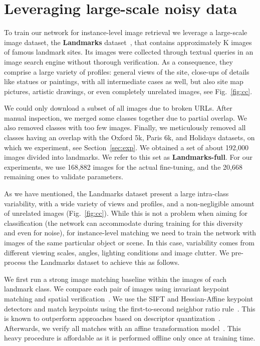 \documentclass[runningheads]{llncs}
\newcommand{\myparagraph}[1]{\noindent {\bf #1.}}
\begin{document}
\section{Leveraging large-scale noisy data}
\label{sec:cleaning}
To train our network for instance-level image retrieval we leverage a large-scale image dataset, the
\textbf{Landmarks} dataset~\cite{Babenko2014}, that contains approximately K images 
of  famous landmark sites. 
Its images were collected through textual queries in an image search engine without thorough verification.
As a consequence, they comprise a large variety of profiles:
general views of the site, close-ups of details like statues or paintings, 
with all intermediate cases as well, but also site map pictures, artistic drawings, or even completely unrelated images, see Fig.~\ref{fig:cc}.

We could only download a subset of all images due to broken URLs. After manual inspection, we merged some classes
together due to partial overlap.  We also removed classes with too few images. Finally, we meticulously removed all
classes having an overlap with the Oxford 5k, Paris 6k, and Holidays datasets, on which we experiment, see
Section~\ref{sec:exp}.
We obtained a set of about 192,000 images divided into  landmarks.
We refer to this set as \textbf{Landmarks-full}.
For our experiments, we use 168,882 images for the actual fine-tuning, and the 20,668 remaining ones to validate parameters.

\myparagraph{Cleaning the Landmarks dataset} 
As we have mentioned, the Landmarks dataset present a large intra-class variability, with a wide variety of views and profiles, and
a non-negligible amount of unrelated images 
(Fig.~\ref{fig:cc}). While this is not a problem when aiming for classification (the network can accommodate during
training for this diversity and even for noise), for instance-level matching we need to train the network with images of the same
particular object or scene. In this case, variability comes from different viewing scales, angles, lighting conditions
and image clutter.
We pre-process the Landmarks dataset to achieve this as follows.

We first run a strong image
matching baseline within the images of each landmark class.  We compare each pair of images using invariant keypoint
matching and spatial verification~\cite{Lowe2004}. We use the SIFT and Hessian-Affine keypoint detectors
\cite{Lowe2004,Mikolajczyk2004} and match keypoints using the first-to-second neighbor ratio rule~\cite{Lowe2004}. This is known
to outperform approaches based on descriptor quantization~\cite{Philbin2010}. Afterwards, we verify all matches with an
affine transformation model~\cite{Philbin2007}. This heavy procedure is affordable as it is performed offline only once at training time.
\end{document}
